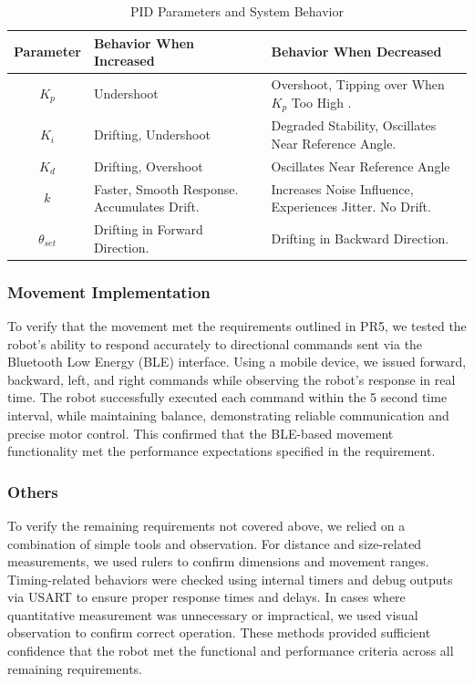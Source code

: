 \documentclass{article}
\begin{document}
\begin{table}[H]
    \centering
    \renewcommand{\arraystretch}{1.3}
    \begin{tabularx}{\textwidth}{|c|X|X|}
        \hline
        \textbf{Parameter} & \textbf{Behavior When Increased} & \textbf{Behavior When Decreased} \\
        \hline
        $K_p$ & Undershoot & Overshoot, Tipping over When $K_p$ Too High .\\
        \hline
        $K_i$ & Drifting, Undershoot & Degraded Stability, Oscillates Near Reference Angle. \\
        \hline
        $K_d$ & Drifting, Overshoot & Oscillates Near Reference Angle \\
        \hline
        $k$ & Faster, Smooth Response. Accumulates Drift. & Increases Noise Influence, Experiences Jitter. No Drift. \\
        \hline
        $\theta_{set}$ & Drifting in Forward Direction. & Drifting in Backward Direction. \\
        \hline
    \end{tabularx}
    \caption{PID Parameters and System Behavior}
    \label{tab:parameter_behavior}
\end{table}

\subsubsection{Movement Implementation}
To verify that the movement met the requirements outlined in PR5, we tested the robot's ability to respond accurately to directional commands sent via the Bluetooth Low Energy (BLE) interface. Using a mobile device, we issued forward, backward, left, and right commands while observing the robot's response in real time. The robot successfully executed each command within the 5 second time interval, while maintaining balance, demonstrating reliable communication and precise motor control. This confirmed that the BLE-based movement functionality met the performance expectations specified in the requirement.

\subsubsection{Others}
To verify the remaining requirements not covered above, we relied on a combination of simple tools and observation. For distance and size-related measurements, we used rulers to confirm dimensions and movement ranges. Timing-related behaviors were checked using internal timers and debug outputs via USART to ensure proper response times and delays. In cases where quantitative measurement was unnecessary or impractical, we used visual observation to confirm correct operation. These methods provided sufficient confidence that the robot met the functional and performance criteria across all remaining requirements.
\end{document}
